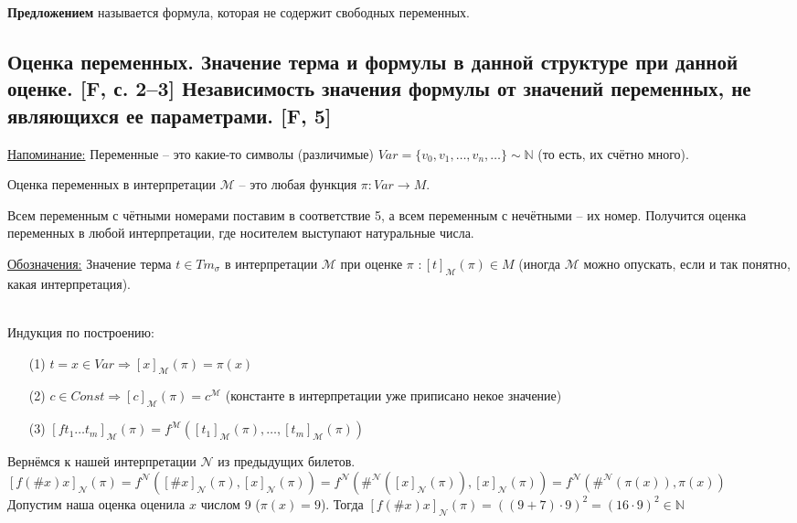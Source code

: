 \documentclass[a4paper, fleqn]{article}
\begin{document}
    \begin{definition}
        \textbf{Предложением} называется формула, которая не содержит свободных переменных.
    \end{definition}
    \subsection{Оценка переменных. Значение терма и формулы в данной структуре при данной оценке. [F, с. 2–3] Независимость значения формулы от значений переменных, не являющихся ее параметрами. [F, 5]}
    \underline{Напоминание:} Переменные -- это какие-то символы (различимые) 
    $Var = \{v_0, v_1, \ldots, v_n, \ldots\} ∼ ℕ$ (то есть, их счётно много).
    \begin{definition}
        Оценка переменных в интерпретации $\mathcal{M}$ -- это любая функция
        $\pi: Var → M$.
    \end{definition}
    \begin{example}
        Всем переменным с чётными номерами поставим в соответствие 5, а
        всем переменным с нечётными -- их номер. 
        Получится оценка переменных в любой интерпретации, где носителем 
        выступают натуральные числа.  
    \end{example}
    \underline{Обозначения:} Значение терма $t ∈ Tm_{\sigma}$ в интерпретации
    $\mathcal{M}$ при оценке $\pi$ $: [t]_{\mathcal{M}}(\pi) ∈ M$ 
    (иногда $\mathcal{M}$ можно опускать, если и так понятно, какая 
    интерпретация).
    \begin{definition} \ \\
        Индукция по построению:  
        \begin{itemize}
            \item[(1)] $ t = x ∈ Var ⇒ [x]_{\mathcal{M}}(\pi) = \pi(x)$
            \item[(2)] $c ∈ Const ⇒ [c]_{\mathcal{M}}(\pi) = c^{\mathcal{M}}$
            (константе в интерпретации уже приписано некое значение)
            \item[(3)] $[ft_1\ldots t_m]_{\mathcal{M}}(\pi) = 
            f^{\mathcal{M}}([t_1]_{\mathcal{M}}(\pi), \ldots, 
            [t_m]_{\mathcal{M}}(\pi))$  
        \end{itemize}
    \end{definition}
    \begin{example}
        Вернёмся к нашей интерпретации $\mathcal{N}$ из предыдущих билетов. \\[9.5pt]
        $[f(\#  x)x]_{\mathcal{N}}(\pi) =
        f^{\mathcal{N}}([\# x]_{\mathcal{N}}(\pi), 
        [x]_{\mathcal{N}}(\pi)) =
        f^{\mathcal{N}}(\#^{\mathcal{N}}([x]_{\mathcal{N}}(\pi)), 
        [x]_{\mathcal{N}}(\pi)) =
        f^{\mathcal{N}}(\#^{\mathcal{N}}(\pi(x)), \pi(x))$ \\[9.5pt]
        Допустим наша оценка оценила $x$ числом 9 ($\pi(x) = 9$). Тогда 
        $[f(\#  x)x]_{\mathcal{N}}(\pi) = ((9 + 7) \cdot 9)^2 = (16 \cdot 9)^2 ∈ \mathbb{N}$
    \end{example}
\end{document}

